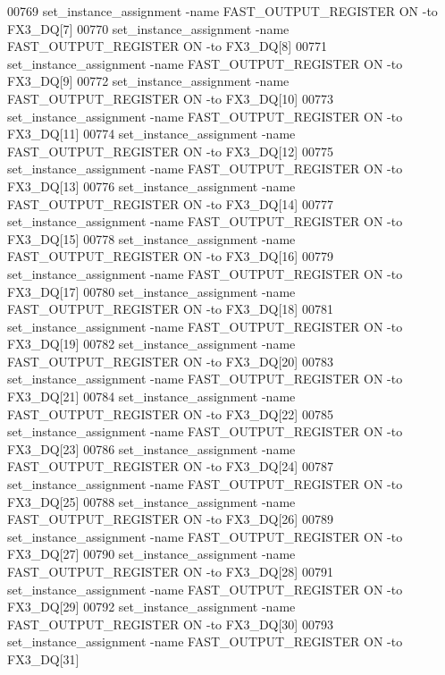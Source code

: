 \begin{DoxyCode}
00769 set\_instance\_assignment -name FAST\_OUTPUT\_REGISTER \textcolor{keywordflow}{ON} -to FX3\_DQ[7]
00770 set\_instance\_assignment -name FAST\_OUTPUT\_REGISTER \textcolor{keywordflow}{ON} -to FX3\_DQ[8]
00771 set\_instance\_assignment -name FAST\_OUTPUT\_REGISTER \textcolor{keywordflow}{ON} -to FX3\_DQ[9]
00772 set\_instance\_assignment -name FAST\_OUTPUT\_REGISTER \textcolor{keywordflow}{ON} -to FX3\_DQ[10]
00773 set\_instance\_assignment -name FAST\_OUTPUT\_REGISTER \textcolor{keywordflow}{ON} -to FX3\_DQ[11]
00774 set\_instance\_assignment -name FAST\_OUTPUT\_REGISTER \textcolor{keywordflow}{ON} -to FX3\_DQ[12]
00775 set\_instance\_assignment -name FAST\_OUTPUT\_REGISTER \textcolor{keywordflow}{ON} -to FX3\_DQ[13]
00776 set\_instance\_assignment -name FAST\_OUTPUT\_REGISTER \textcolor{keywordflow}{ON} -to FX3\_DQ[14]
00777 set\_instance\_assignment -name FAST\_OUTPUT\_REGISTER \textcolor{keywordflow}{ON} -to FX3\_DQ[15]
00778 set\_instance\_assignment -name FAST\_OUTPUT\_REGISTER \textcolor{keywordflow}{ON} -to FX3\_DQ[16]
00779 set\_instance\_assignment -name FAST\_OUTPUT\_REGISTER \textcolor{keywordflow}{ON} -to FX3\_DQ[17]
00780 set\_instance\_assignment -name FAST\_OUTPUT\_REGISTER \textcolor{keywordflow}{ON} -to FX3\_DQ[18]
00781 set\_instance\_assignment -name FAST\_OUTPUT\_REGISTER \textcolor{keywordflow}{ON} -to FX3\_DQ[19]
00782 set\_instance\_assignment -name FAST\_OUTPUT\_REGISTER \textcolor{keywordflow}{ON} -to FX3\_DQ[20]
00783 set\_instance\_assignment -name FAST\_OUTPUT\_REGISTER \textcolor{keywordflow}{ON} -to FX3\_DQ[21]
00784 set\_instance\_assignment -name FAST\_OUTPUT\_REGISTER \textcolor{keywordflow}{ON} -to FX3\_DQ[22]
00785 set\_instance\_assignment -name FAST\_OUTPUT\_REGISTER \textcolor{keywordflow}{ON} -to FX3\_DQ[23]
00786 set\_instance\_assignment -name FAST\_OUTPUT\_REGISTER \textcolor{keywordflow}{ON} -to FX3\_DQ[24]
00787 set\_instance\_assignment -name FAST\_OUTPUT\_REGISTER \textcolor{keywordflow}{ON} -to FX3\_DQ[25]
00788 set\_instance\_assignment -name FAST\_OUTPUT\_REGISTER \textcolor{keywordflow}{ON} -to FX3\_DQ[26]
00789 set\_instance\_assignment -name FAST\_OUTPUT\_REGISTER \textcolor{keywordflow}{ON} -to FX3\_DQ[27]
00790 set\_instance\_assignment -name FAST\_OUTPUT\_REGISTER \textcolor{keywordflow}{ON} -to FX3\_DQ[28]
00791 set\_instance\_assignment -name FAST\_OUTPUT\_REGISTER \textcolor{keywordflow}{ON} -to FX3\_DQ[29]
00792 set\_instance\_assignment -name FAST\_OUTPUT\_REGISTER \textcolor{keywordflow}{ON} -to FX3\_DQ[30]
00793 set\_instance\_assignment -name FAST\_OUTPUT\_REGISTER \textcolor{keywordflow}{ON} -to FX3\_DQ[31]

\end{DoxyCode}

